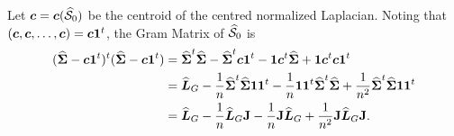 Let $\cent=\cent(\splxn_0)$ be the centroid of the centred normalized Laplacian. Noting that $(\cent,\cent,\dots,\cent)=\cent\one^\tp$, 
the Gram Matrix of $\splxn_0$ is 
\begin{align*}
(\Svn-\cent\one^\tp)^\tp(\Svn-\cent\one^\tp) &= \Svn^\tp\Svn - \Svn^\tp\cent\one^\tp - \one\cent^\tp\Svn + \one\cent^\tp\cent\one^\tp \\
&= \Ln_G - \frac{1}{n} \Svn^\tp\Svn\one\one^\tp - \frac{1}{n}\one\one^\tp\Svn^\tp\Svn + \frac{1}{n^2}\Svn^\tp\Svn\one\one^\tp \\
&= \Ln_G - \frac{1}{n}\Ln_G\J - \frac{1}{n} \J\Ln_G+ \frac{1}{n^2}\J\Ln_G\J.\\
\end{align*}









